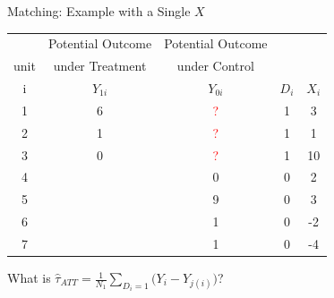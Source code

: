 \documentclass[xcolor=dvipsnames]{beamer}
\begin{document}
\begin{frame}{Matching: Example with a Single $X$}
\begin{tabular}{c|c|c|c|c}
 & Potential Outcome & Potential Outcome &   & \\
unit &under Treatment  & under Control &   &  \\

\hline
   i  & $Y_{1i}$  & $Y_{0i}$ &    $D_i$ &  $X_i$ \\
\hline
         1 & \multicolumn{ 1}{c|}{6} & \multicolumn{ 1}{c|}{\textcolor{red}{?}} &                    1 &          3 \\
         2 & \multicolumn{ 1}{c|}{1} & \multicolumn{ 1}{c|}{\textcolor{red}{?}} &                    1 &          1 \\
         3 & \multicolumn{ 1}{c|}{0} & \multicolumn{ 1}{c|}{\textcolor{red}{?}} &                    1 &          10 \\
\hline
         4 & \multicolumn{ 1}{c|}{} & \multicolumn{1}{c|}{0} &                    0 &          2 \\
         5 & \multicolumn{ 1}{c|}{} & \multicolumn{1}{c|}{9} &                    0 &          3 \\
         6 & \multicolumn{ 1}{c|}{} & \multicolumn{1}{c|}{1} &                    0 &          -2 \\
         7 & \multicolumn{ 1}{c|}{} & \multicolumn{1}{c|}{1} &                    0 &          -4 \\
         \hline
\end{tabular}

What is
$\widehat{\tau}_{ATT}= \frac{1}{N_1} \sum_{D_i=1} \big(Y_i - Y_{j(i)}\big)$?
\end{frame}
\end{document}
